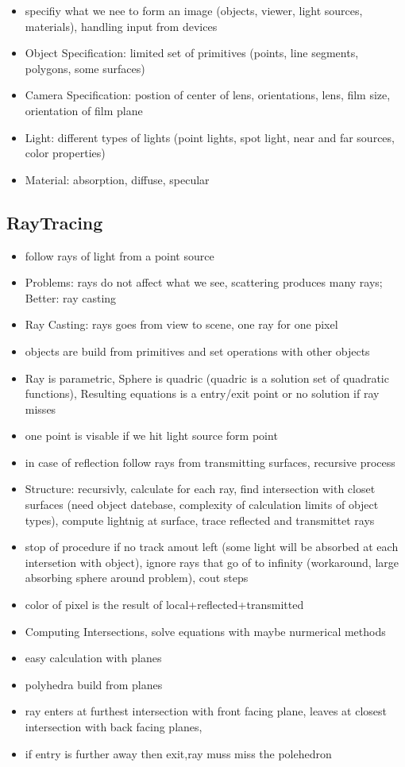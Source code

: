 \documentclass[11pt,a4paper]{article}
\begin{document}
\begin{itemize}
\begin{itemize}
				\item specifiy what we nee to form an image (objects, viewer, light sources, materials), handling input from devices
				\item Object Specification: limited set of primitives (points, line segments, polygons, some surfaces)
				\item Camera Specification: postion of center of lens, orientations, lens, film size, orientation of film plane
				\item Light: different types of lights (point lights, spot light, near and far sources, color properties)
				\item Material: absorption, diffuse, specular
			\end{itemize}
		\end{itemize}
	\subsection{RayTracing}
		\begin{itemize}
			\item follow rays of light from a point source
			\item Problems: rays do not affect what we see, scattering produces many rays; Better: ray casting
			\item Ray Casting: rays goes from view to scene, one ray for one pixel
			\item objects are build from primitives and set operations with other objects
			\item Ray is parametric, Sphere is quadric (quadric is a solution set of quadratic functions), Resulting equations is a entry/exit point or no solution if ray misses
			\item one point is visable if we hit light source form point
			\item in case of reflection follow rays from transmitting surfaces, recursive process
			\item Structure: recursivly, calculate for each ray, find intersection with closet surfaces (need object datebase, complexity of calculation limits of object types), compute lightnig at surface, trace reflected and transmittet rays
			\item stop of procedure if no track amout left (some light will be absorbed at each intersetion with object), ignore rays that go of to infinity (workaround, large absorbing sphere around problem), cout steps
			\item color of pixel is the result of local+reflected+transmitted
			\item Computing Intersections, solve equations with maybe nurmerical methods 
			\item easy calculation with planes
			\item polyhedra build from planes
			\item ray enters at furthest intersection with front facing plane, leaves at closest intersection with back facing planes,
			\item if entry is further away then exit,ray muss miss the polehedron
		\end{itemize}
\end{document}

